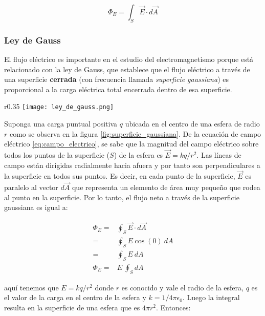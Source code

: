 \begin{equation}
    \Phi_E = \int_{S} \vec{E} \cdot d\vec{A}
    \label{eq:flujo_electrico_integral}
\end{equation}

\subsubsection{Ley de Gauss}

El flujo eléctrico es importante en el estudio del electromagnetismo porque está relacionado con la ley de Gauss, que establece que el flujo eléctrico a través de una superficie \textbf{cerrada} (con frecuencia llamada \textit{superficie gaussiana}) es proporcional a la carga eléctrica total encerrada dentro de esa superficie.

\begin{wrapfigure}{r}{0.35\textwidth}
    \centering
    \texttt{[image: ley\_de\_gauss.png]}
    \caption{Superficie gaussiana esférica de radio \(r\) que rodea una carga puntual \(q\).}
    \label{fig:superficie_gaussiana}
\end{wrapfigure}

Suponga una carga puntual positiva \(q\) ubicada en el centro de una esfera de radio \(r\) como se observa en la figura \ref{fig:superficie_gaussiana}. De la ecuación de campo eléctrico \eqref{eq:campo_electrico}, se sabe que la magnitud del campo eléctrico sobre todos los puntos de la superficie (\(S\)) de la esfera es \(\vec{E} = k q/r^2\). Las líneas de campo están dirigidas radialmente hacia afuera y por tanto son perpendiculares a la superficie en todos sus puntos. Es decir, en cada punto de la superficie, \(\vec{E}\) es paralelo al vector \(d\vec{A}\) que representa un elemento de área muy pequeño que rodea al punto en la superficie. Por lo tanto, el flujo neto a través de la superficie gaussiana es igual a:

\begin{align*}
    \Phi_E =& \oint_S \vec{E} \cdot d\vec{A} \\
            =& \oint_S E \cos(0) ~ dA \\
            =& \oint_S E ~ dA \\
    \Phi_E =& E ~ \oint_S dA
\end{align*}

aquí tenemos que \(E=kq/r^2\) donde \(r\) es conocido y vale el radio de la esfera, \(q\) es el valor de la carga en el centro de la esfera y \(k = 1/4\pi\epsilon_0\). Luego la integral resulta en la superficie de una esfera que es \(4\pi r^2\). Entonces:

